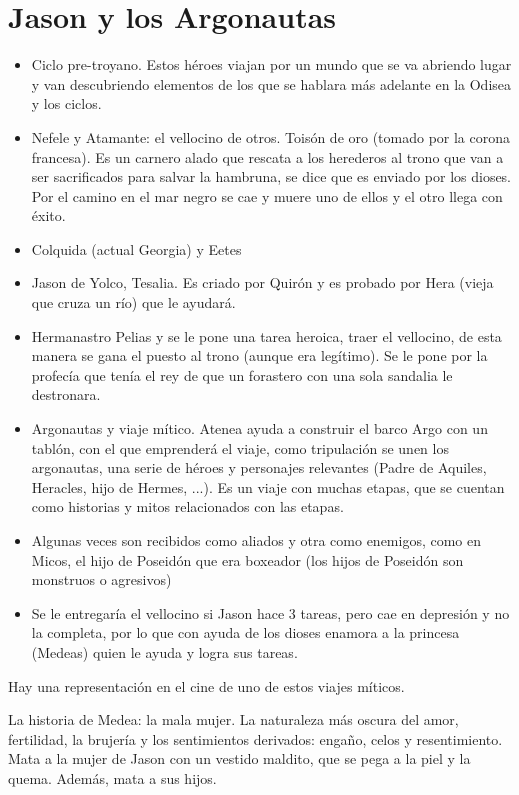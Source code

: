 \section{Jason y los Argonautas}
\begin{itemize}
	\item Ciclo pre-troyano. Estos héroes viajan por un mundo que se va abriendo lugar y van descubriendo elementos de los que se hablara más adelante en la Odisea y los ciclos.
	\item Nefele y Atamante: el vellocino de otros. Toisón de oro (tomado por la corona francesa). Es un carnero alado que rescata a los herederos al trono que van a ser sacrificados para salvar la hambruna, se dice que es enviado por los dioses. Por el camino en el mar negro se cae y muere uno de ellos y el otro llega con éxito.
	\item Colquida (actual Georgia) y Eetes
	\item Jason de Yolco, Tesalia. Es criado por Quirón y es probado por Hera (vieja que cruza un río) que le ayudará.
	\item Hermanastro Pelias y se le pone una tarea heroica, traer el vellocino, de esta manera se gana el puesto al trono (aunque era legítimo). Se le pone por la profecía que tenía el rey de que un forastero con una sola sandalia le destronara.
	\item Argonautas y viaje mítico. Atenea ayuda a construir el barco Argo con un tablón, con el que emprenderá el viaje, como tripulación se unen los argonautas, una serie de héroes y personajes relevantes (Padre de Aquiles, Heracles, hijo de Hermes, ...). Es un viaje con muchas etapas, que se cuentan como historias y mitos relacionados con las etapas.
	\item Algunas veces son recibidos como aliados y otra como enemigos, como en Micos, el hijo de Poseidón que era boxeador (los hijos de Poseidón son monstruos o agresivos)
	\item Se le entregaría el vellocino si Jason hace 3 tareas, pero cae en depresión y no la completa, por lo que con ayuda de los dioses enamora a la princesa (Medeas) quien le ayuda y logra sus tareas.
\end{itemize}

Hay una representación en el cine de uno de estos viajes míticos.

La historia de Medea: la mala mujer. La naturaleza más oscura del amor, fertilidad, la brujería y los sentimientos derivados: engaño, celos y resentimiento. Mata a la mujer de Jason con un vestido maldito, que se pega a la piel y la quema. Además, mata a sus hijos.

